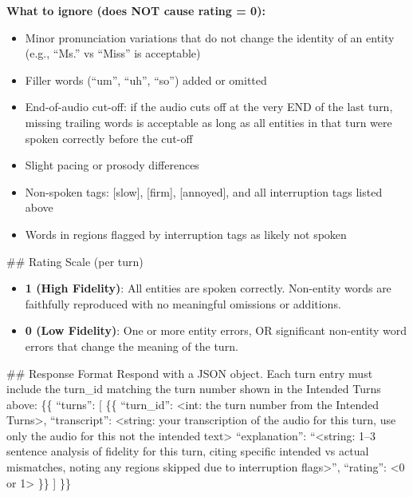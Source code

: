 \begin{tcolorbox}[promptbox, title={\small Speech Fidelity Prompt}]
        \textbf{What to ignore (does NOT cause rating = 0):}
        \begin{itemize}
          \item Minor pronunciation variations that do not change the identity of an entity (e.g., ``Ms.'' vs ``Miss'' is acceptable)
          \item Filler words (``um'', ``uh'', ``so'') added or omitted
          \item End-of-audio cut-off: if the audio cuts off at the very END of the last turn, missing trailing words is acceptable as long as all entities in that turn were spoken correctly before the cut-off
          \item Slight pacing or prosody differences
          \item Non-spoken tags: [slow], [firm], [annoyed], and all interruption tags listed above
          \item Words in regions flagged by interruption tags as likely not spoken
        \end{itemize}

        \#\# Rating Scale (per turn)
        \begin{itemize}
          \item \textbf{1 (High Fidelity)}: All entities are spoken correctly. Non-entity words are faithfully reproduced with no meaningful omissions or additions.
          \item \textbf{0 (Low Fidelity)}: One or more entity errors, OR significant non-entity word errors that change the meaning of the turn.
        \end{itemize}

        \#\# Response Format\newline
        Respond with a JSON object. Each turn entry must include the turn\_id matching the turn number shown in the Intended Turns above:\newline
        \{\{\newline
          ``turns'': [\newline
            \{\{\newline
              ``turn\_id'': \textless{}int: the turn number from the Intended Turns\textgreater{},\newline
              ``transcript'': \textless{}string: your transcription of the audio for this turn, use only the audio for this not the intended text\textgreater{}\newline
              ``explanation'': ``\textless{}string: 1--3 sentence analysis of fidelity for this turn, citing specific intended vs actual mismatches, noting any regions skipped due to interruption flags\textgreater{}'',\newline
              ``rating'': \textless{}0 or 1\textgreater{}\newline
            \}\}\newline
          ]\newline
        \}\}
\end{tcolorbox}

